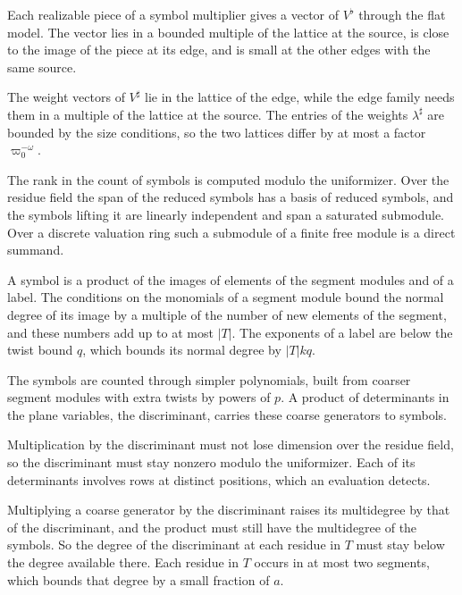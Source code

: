 Each realizable piece of a symbol multiplier gives a vector of $V^\flat$ through the flat model. The
vector lies in a bounded multiple of the lattice at the source, is close to the image of the piece at
its edge, and is small at the other edges with the same source.

The weight vectors of $V^\sharp$ lie in the lattice of the edge, while the edge family needs them in a
multiple of the lattice at the source. The entries of the weights $\lambda^\sharp$ are bounded by the
size conditions, so the two lattices differ by at most a factor $\varpi_0^{-\omega}$.

The rank in the count of symbols is computed modulo the uniformizer. Over the residue field the span of
the reduced symbols has a basis of reduced symbols, and the symbols lifting it are linearly
independent and span a saturated submodule. Over a discrete valuation ring such a submodule of a
finite free module is a direct summand.

A symbol is a product of the images of elements of the segment modules and of a label. The conditions
on the monomials of a segment module bound the normal degree of its image by a multiple of the number
of new elements of the segment, and these numbers add up to at most $|T|$. The exponents of a label
are below the twist bound $q$, which bounds its normal degree by $|T|kq$.

The symbols are counted through simpler polynomials, built from coarser segment modules with extra
twists by powers of $p$. A product of determinants in the plane variables, the discriminant, carries
these coarse generators to symbols.

Multiplication by the discriminant must not lose dimension over the residue field, so the
discriminant must stay nonzero modulo the uniformizer. Each of its determinants involves rows at
distinct positions, which an evaluation detects.

Multiplying a coarse generator by the discriminant raises its multidegree by that of the discriminant,
and the product must still have the multidegree of the symbols. So the degree of the discriminant at
each residue in $T$ must stay below the degree available there. Each residue in $T$ occurs in at most
two segments, which bounds that degree by a small fraction of $a$.


